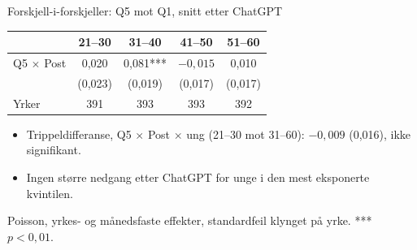 \begin{frame}{Forskjell-i-forskjeller: Q5 mot Q1, snitt etter ChatGPT}
\centering
\setlength{\tabcolsep}{8pt}
\begin{tabular}{lcccc}
\toprule
 & 21--30 & 31--40 & 41--50 & 51--60 \\
\midrule
Q5 $\times$ Post & 0,020 & 0,081*** & $-0{,}015$ & 0,010 \\
                 & (0,023) & (0,019) & (0,017) & (0,017) \\
\midrule
Yrker & 391 & 393 & 393 & 392 \\
\bottomrule
\end{tabular}

\vspace{0.8em}
\begin{itemize}\setlength{\itemsep}{4pt}
  \item Trippeldifferanse, Q5 $\times$ Post $\times$ ung (21--30 mot 31--60): $-0{,}009$ (0,016), ikke signifikant.
  \item Ingen større nedgang etter ChatGPT for unge i den mest eksponerte kvintilen.
\end{itemize}

\vspace{0.2em}
\footnotesize
Poisson, yrkes- og månedsfaste effekter, standardfeil klynget på yrke. *** $p<0{,}01$.
\end{frame}

